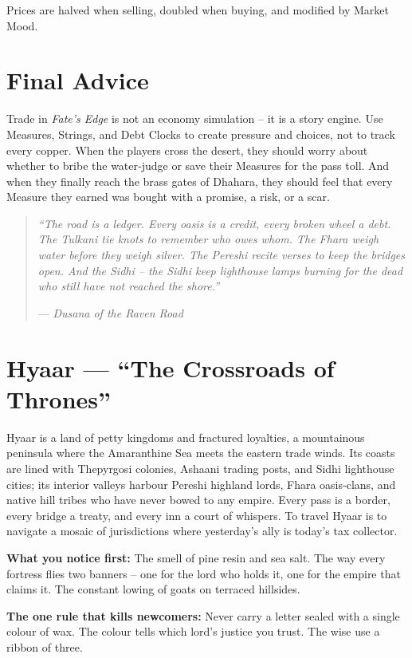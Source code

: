 \documentclass[11pt]{book}
\newenvironment{lorebox}{\begin{quote}\small\itshape}{\end{quote}}
\begin{document}
Prices are halved when selling, doubled when buying, and modified by Market Mood.

\section{Final Advice}
Trade in \textit{Fate's Edge} is not an economy simulation – it is a story engine. Use Measures, Strings, and Debt Clocks to create pressure and choices, not to track every copper. When the players cross the desert, they should worry about whether to bribe the water‑judge or save their Measures for the pass toll. And when they finally reach the brass gates of Dhahara, they should feel that every Measure they earned was bought with a promise, a risk, or a scar.

\begin{lorebox}
“The road is a ledger. Every oasis is a credit, every broken wheel a debt. The Tulkani tie knots to remember who owes whom. The Fhara weigh water before they weigh silver. The Pereshi recite verses to keep the bridges open. And the Sidhi – the Sidhi keep lighthouse lamps burning for the dead who still have not reached the shore.”

--- \textit{Dusana of the Raven Road}
\end{lorebox}
\section{Hyaar — ``The Crossroads of Thrones''}
\label{sec:hyaar}

\begin{tcolorbox}[colback=black!3,colframe=blue!60!black,title={Theme \& Atmosphere}]
Hyaar is a land of petty kingdoms and fractured loyalties, a mountainous peninsula where the Amaranthine Sea meets the eastern trade winds. Its coasts are lined with Thepyrgosi colonies, Ashaani trading posts, and Sidhi lighthouse cities; its interior valleys harbour Pereshi highland lords, Fhara oasis‑clans, and native hill tribes who have never bowed to any empire. Every pass is a border, every bridge a treaty, and every inn a court of whispers. To travel Hyaar is to navigate a mosaic of jurisdictions where yesterday’s ally is today’s tax collector.

\vspace{2mm}
\textbf{What you notice first:} The smell of pine resin and sea salt. The way every fortress flies two banners – one for the lord who holds it, one for the empire that claims it. The constant lowing of goats on terraced hillsides.

\textbf{The one rule that kills newcomers:} Never carry a letter sealed with a single colour of wax. The colour tells which lord’s justice you trust. The wise use a ribbon of three.
\end{tcolorbox}
\end{document}
